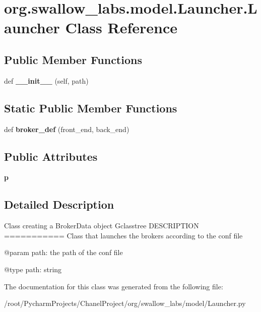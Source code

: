 \hypertarget{classorg_1_1swallow__labs_1_1model_1_1_launcher_1_1_launcher}{}\section{org.\+swallow\+\_\+labs.\+model.\+Launcher.\+Launcher Class Reference}
\label{classorg_1_1swallow__labs_1_1model_1_1_launcher_1_1_launcher}
\subsection*{Public Member Functions}
\begin{DoxyCompactItemize}
\item 
\hypertarget{classorg_1_1swallow__labs_1_1model_1_1_launcher_1_1_launcher_a8b6d5a0cd689c195b9fcf200b372745c}{}def {\bfseries \+\_\+\+\_\+init\+\_\+\+\_\+} (self, path)\label{classorg_1_1swallow__labs_1_1model_1_1_launcher_1_1_launcher_a8b6d5a0cd689c195b9fcf200b372745c}

\end{DoxyCompactItemize}
\subsection*{Static Public Member Functions}
\begin{DoxyCompactItemize}
\item 
\hypertarget{classorg_1_1swallow__labs_1_1model_1_1_launcher_1_1_launcher_a7dd11f2ffbe77723703837cfb3b556e7}{}def {\bfseries broker\+\_\+def} (front\+\_\+end, back\+\_\+end)\label{classorg_1_1swallow__labs_1_1model_1_1_launcher_1_1_launcher_a7dd11f2ffbe77723703837cfb3b556e7}

\end{DoxyCompactItemize}
\subsection*{Public Attributes}
\begin{DoxyCompactItemize}
\item 
\hypertarget{classorg_1_1swallow__labs_1_1model_1_1_launcher_1_1_launcher_ac5073912dab4b48f7a8118f32c6a239b}{}{\bfseries p}\label{classorg_1_1swallow__labs_1_1model_1_1_launcher_1_1_launcher_ac5073912dab4b48f7a8118f32c6a239b}

\end{DoxyCompactItemize}


\subsection{Detailed Description}
\begin{DoxyVerb}    Class creating a BrokerData object
    G{classtree}
    DESCRIPTION
    ===========
    Class that launches the brokers according to the conf file

    @param path:    the path of the conf file

    @type path: string\end{DoxyVerb}
 

The documentation for this class was generated from the following file\+:\begin{DoxyCompactItemize}
\item 
/root/\+Pycharm\+Projects/\+Chanel\+Project/org/swallow\+\_\+labs/model/Launcher.\+py\end{DoxyCompactItemize}
